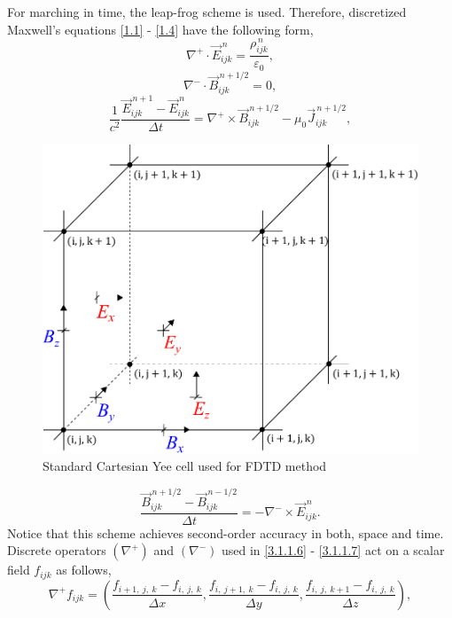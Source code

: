 For marching in time, the leap-frog scheme is used. Therefore, discretized Maxwell's equations \ref{1.1} - \ref{1.4} have the following form,
\begin{equation}
\label{3.1.1.6}
\nabla^{+} \cdot \vec{E}_{ijk}^{\,n} = \frac{\rho_{ijk}^{\,n}}{\varepsilon_0},
\end{equation}
\begin{equation}
\label{3.1.1.15}
\nabla^{-} \cdot \vec{B}_{ijk}^{\,n + 1/2} = 0,
\end{equation}
\begin{equation}
\label{3.1.1.16}
\frac{1}{c^{2}} \frac{\vec{E}_{ijk}^{\,n + 1} - \vec{E}_{ijk}^{\,n}}{\Delta t} = \nabla^{+} \times \vec{B}_{ijk}^{\,n + 1/2} - \mu_{0} \vec{J}_{ijk}^{\,n + 1/2},
\end{equation}
\begin{figure}[t]
	\centering
	\includegraphics[width=0.4\paperwidth]{./img/YEE/yee.pdf}
	\caption{Standard Cartesian Yee cell used for FDTD method}
	\label{3.1.1.14}
\end{figure}
\begin{equation}
\label{3.1.1.7}
\frac{\vec{B}_{ijk}^{\,n + 1/2} - \vec{B}_{ijk}^{\,n - 1/2}}{\Delta t} = -\nabla^{-} \times \vec{E}_{ijk}^{\,n}.
\end{equation}
Notice that this scheme achieves second-order accuracy in both, space and time. Discrete operators $ \left(\nabla^{+}\right) $ and $ \left(\nabla^{-}\right) $ used in \ref{3.1.1.6} - \ref{3.1.1.7} act on a scalar field $ f_{i j k} $ as follows,
\begin{equation}
\label{3.1.1.8}
\nabla^{+} f_{i j k} = \left(\frac{f_{i + 1,\: j,\: k} - f_{i,\: j,\: k}}{\Delta x}, \frac{f_{i,\: j + 1,\: k} - f_{i,\: j,\: k}}{\Delta y}, \frac{f_{i,\: j,\: k + 1} - f_{i,\: j,\: k}}{\Delta z} \right), 
\end{equation}

